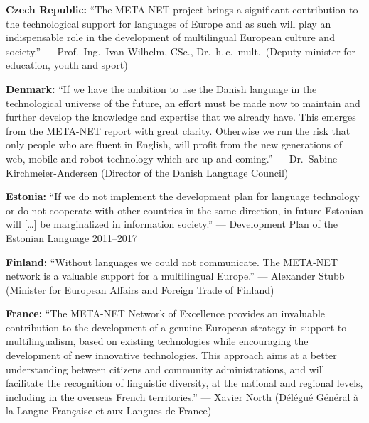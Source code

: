 \documentclass[10pt, plain]{../../metanetpaper}
\begin{document}
\maketitle

\clearpage


\makefundingnotice

\clearpage



\textbf{Czech Republic:} ``The META-NET project brings a significant contribution to the technological support for languages of Europe and as such will play an indispensable role in the development of multilingual European culture and society.'' --- Prof.~Ing.~Ivan Wilhelm, CSc., Dr.~h.\,c.~mult.~(Deputy minister for education, youth and sport)

\bigskip \textbf{Denmark:} ``If we have the ambition to use the Danish language in the technological universe of the future, an effort must be made now to maintain and further develop the knowledge and expertise that we already have. This emerges from the META-NET report with great clarity. Otherwise we run the risk that only people who are fluent in English, will profit from the new generations of web, mobile and robot technology which are up and coming.'' --- Dr.~Sabine Kirchmeier-Andersen (Director of the Danish Language Council)

\bigskip \textbf{Estonia:} ``If we do not implement the development plan for language technology or do not cooperate with other countries in the same direction, in future Estonian will [\dots] be marginalized in information society.'' --- Development Plan of the Estonian Language 2011--2017

\bigskip \textbf{Finland:} ``Without languages we could not communicate. The META-NET network is a valuable support for a multilingual Europe.'' --- Alexander Stubb (Minister for European Affairs and Foreign Trade of Finland)

\bigskip \textbf{France:} ``The META-NET Network of Excellence provides an invaluable contribution to the development of a genuine European strategy in support to multilingualism, based on existing technologies while encouraging the development of new innovative technologies. This approach aims at a better understanding between citizens and community administrations, and will facilitate the recognition of linguistic diversity, at the national and regional levels, including in the overseas French territories.'' --- Xavier North (Délégué Général à la Langue Française et aux Langues de France)
\end{document}
